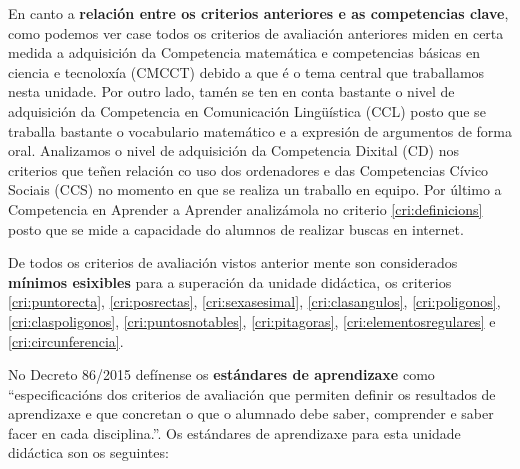 En canto a \textbf{relación entre os criterios anteriores e as competencias clave}, como podemos ver case todos os criterios de avaliación anteriores miden en certa medida a adquisición da Competencia matemática e competencias básicas en ciencia e tecnoloxía (CMCCT) debido a que é o tema central que traballamos nesta unidade. Por outro lado, tamén se ten en conta bastante o nivel de adquisición da Competencia en Comunicación Lingüística (CCL) posto que se traballa bastante o vocabulario matemático e a expresión de argumentos de forma oral. Analizamos o nivel de adquisición da Competencia Dixital (CD) nos criterios que teñen relación co uso dos ordenadores e das Competencias Cívico Sociais (CCS) no momento en que se realiza un traballo en equipo. Por último a Competencia en Aprender a Aprender analizámola no criterio \ref{cri:definicions} posto que se mide a capacidade do alumnos de realizar buscas en internet.

De todos os criterios de avaliación vistos anterior mente son considerados \textbf{mínimos esixibles} para a superación da unidade didáctica, os criterios \ref{cri:puntorecta}, \ref{cri:posrectas}, \ref{cri:sexasesimal}, \ref{cri:clasangulos}, \ref{cri:poligonos}, \ref{cri:claspoligonos}, \ref{cri:puntosnotables}, \ref{cri:pitagoras}, \ref{cri:elementosregulares} e \ref{cri:circunferencia}.

No Decreto 86/2015 defínense os \textbf{estándares de aprendizaxe} como ``especificacións dos criterios de avaliación que permiten definir os resultados de aprendizaxe e que concretan o que o alumnado debe saber, comprender e saber facer en cada disciplina.''. Os estándares de aprendizaxe para esta unidade didáctica son os seguintes:

